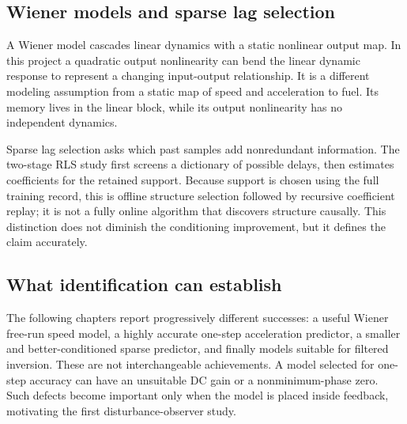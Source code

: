 \subsection{Wiener models and sparse lag selection}
A Wiener model cascades linear dynamics with a static nonlinear output map. In this project a quadratic output nonlinearity can bend the linear dynamic response to represent a changing input-output relationship. It is a different modeling assumption from a static map of speed and acceleration to fuel. Its memory lives in the linear block, while its output nonlinearity has no independent dynamics.

Sparse lag selection asks which past samples add nonredundant information. The two-stage RLS study first screens a dictionary of possible delays, then estimates coefficients for the retained support. Because support is chosen using the full training record, this is offline structure selection followed by recursive coefficient replay; it is not a fully online algorithm that discovers structure causally. This distinction does not diminish the conditioning improvement, but it defines the claim accurately.

\subsection{What identification can establish}
The following chapters report progressively different successes: a useful Wiener free-run speed model, a highly accurate one-step acceleration predictor, a smaller and better-conditioned sparse predictor, and finally models suitable for filtered inversion. These are not interchangeable achievements. A model selected for one-step accuracy can have an unsuitable DC gain or a nonminimum-phase zero. Such defects become important only when the model is placed inside feedback, motivating the first disturbance-observer study.


